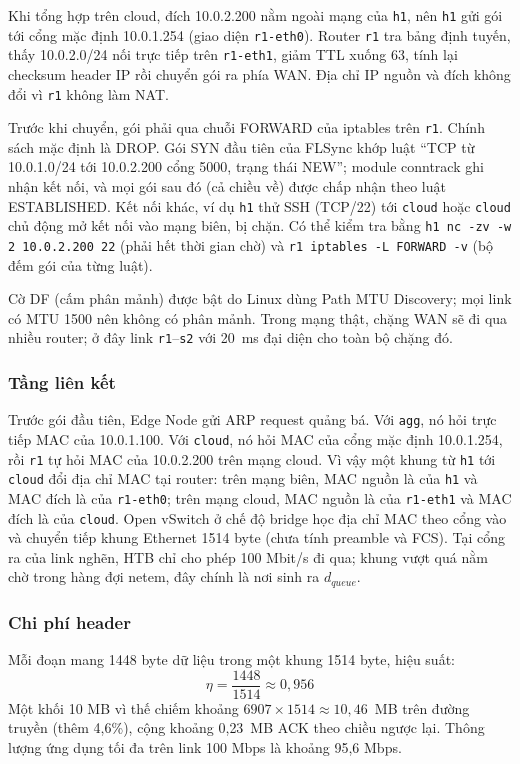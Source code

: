 Khi tổng hợp trên cloud, đích 10.0.2.200 nằm ngoài mạng của \texttt{h1}, nên \texttt{h1} gửi gói tới cổng mặc định 10.0.1.254 (giao diện \texttt{r1-eth0}). Router \texttt{r1} tra bảng định tuyến, thấy 10.0.2.0/24 nối trực tiếp trên \texttt{r1-eth1}, giảm TTL xuống 63, tính lại checksum header IP rồi chuyển gói ra phía WAN. Địa chỉ IP nguồn và đích không đổi vì \texttt{r1} không làm NAT.

Trước khi chuyển, gói phải qua chuỗi FORWARD của iptables trên \texttt{r1}. Chính sách mặc định là DROP. Gói SYN đầu tiên của FLSync khớp luật ``TCP từ 10.0.1.0/24 tới 10.0.2.200 cổng 5000, trạng thái NEW''; module conntrack ghi nhận kết nối, và mọi gói sau đó (cả chiều về) được chấp nhận theo luật ESTABLISHED. Kết nối khác, ví dụ \texttt{h1} thử SSH (TCP/22) tới \texttt{cloud} hoặc \texttt{cloud} chủ động mở kết nối vào mạng biên, bị chặn. Có thể kiểm tra bằng \texttt{h1 nc -zv -w 2 10.0.2.200 22} (phải hết thời gian chờ) và \texttt{r1 iptables -L FORWARD -v} (bộ đếm gói của từng luật).

Cờ DF (cấm phân mảnh) được bật do Linux dùng Path MTU Discovery; mọi link có MTU 1500 nên không có phân mảnh. Trong mạng thật, chặng WAN sẽ đi qua nhiều router; ở đây link \texttt{r1}--\texttt{s2} với 20~ms đại diện cho toàn bộ chặng đó.

\subsubsection{Tầng liên kết}
Trước gói đầu tiên, Edge Node gửi ARP request quảng bá. Với \texttt{agg}, nó hỏi trực tiếp MAC của 10.0.1.100. Với \texttt{cloud}, nó hỏi MAC của cổng mặc định 10.0.1.254, rồi \texttt{r1} tự hỏi MAC của 10.0.2.200 trên mạng cloud. Vì vậy một khung từ \texttt{h1} tới \texttt{cloud} đổi địa chỉ MAC tại router: trên mạng biên, MAC nguồn là của \texttt{h1} và MAC đích là của \texttt{r1-eth0}; trên mạng cloud, MAC nguồn là của \texttt{r1-eth1} và MAC đích là của \texttt{cloud}. Open vSwitch ở chế độ bridge học địa chỉ MAC theo cổng vào và chuyển tiếp khung Ethernet 1514 byte (chưa tính preamble và FCS). Tại cổng ra của link nghẽn, HTB chỉ cho phép 100 Mbit/s đi qua; khung vượt quá nằm chờ trong hàng đợi netem, đây chính là nơi sinh ra $d_{queue}$.

\subsubsection{Chi phí header}
Mỗi đoạn mang 1448 byte dữ liệu trong một khung 1514 byte, hiệu suất:
\begin{equation}
    \eta = \frac{1448}{1514} \approx 0{,}956
    \label{eq:eta}
\end{equation}
Một khối 10 MB vì thế chiếm khoảng $6907 \times 1514 \approx 10{,}46$~MB trên đường truyền (thêm 4{,}6\%), cộng khoảng 0{,}23~MB ACK theo chiều ngược lại. Thông lượng ứng dụng tối đa trên link 100 Mbps là khoảng 95{,}6 Mbps.

